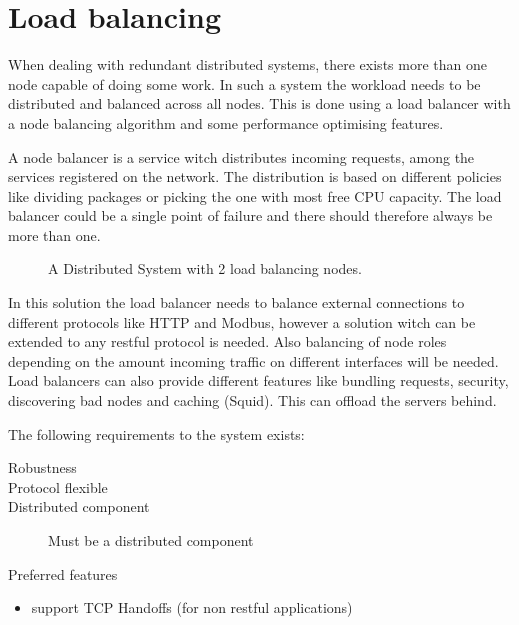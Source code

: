 \chapter{Load balancing}

When dealing with redundant distributed systems, there exists more than one node capable of doing some work.
In such a system the workload needs to be distributed and balanced across all nodes.
This is done using a load balancer with a node balancing algorithm and some performance optimising features.

A node balancer is a service witch distributes incoming requests, among the services registered on the network.
The distribution is based on different policies like dividing packages or picking the one with most free CPU capacity.
The load balancer could be a single point of failure and there should therefore always be more than one. 

\begin{figure}[h!]
	\centering	
	\scalebox{0.7}{}
	\caption[Distributed System with 2 load balancing nodes]{
		\label{fig:distributedCoputingSystem} 
		\footnotesize{%
			A Distributed System with 2 load balancing nodes.
		}
	}
\end{figure}

In this solution the load balancer needs to balance external connections to different protocols like HTTP and Modbus, however a solution witch can be extended to any restful protocol is needed. Also balancing of node roles depending on the amount incoming traffic on different interfaces will be needed.
Load balancers can also provide different features like bundling requests, security, discovering bad nodes and caching (Squid). This can offload the servers behind.

The following requirements to the system exists:
\begin{description}
	\item[Robustness]
	\item[Protocol flexible]
	\item[Distributed component] Must be a distributed component
\end{description}

Preferred features
\begin{itemize}
	\item support TCP Handoffs (for non restful applications)
\end{itemize}

